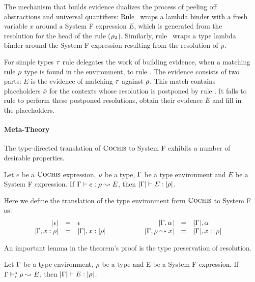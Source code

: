 The mechanism that builds evidence dualizes the process of peeling off
abstractions and universal quantifiers: Rule ~wraps a lambda
binder with a fresh variable $x$ around a System F expression $E$, which is
generated from the resolution for the head of the rule ($\rho_2$). Similarly,
rule ~wraps a type lambda binder around the System F expression
resulting from the resolution of $\rho$.

For simple types $\tau$ rule  delegates the work of
building evidence, when a matching rule $\rho$ type is found in the
environment, to rule . The evidence consists of two parts:
$E$ is the evidence of matching $\tau$ against $\rho$. This match contains
placeholders $\bar{x}$ for the contexts whose resolution is postponed by rule
. It falls to rule  to perform these
postponed resolutions, obtain their evidence $\bar{E}$ and fill in the
placeholders.

\paragraph{Meta-Theory} The type-directed translation of $\textsc{Cochis}$ to System F exhibits a number
of desirable properties.

\begin{theorem}\label{thm:type:preservation} Let $e$ be a $\textsc{Cochis}$
  expression, $\rho$ be a type, $\Gamma$ be a type environment and $E$ be a System F expression. If
  $\Gamma \vdash e:\rho \leadsto E$, then $|\Gamma| \vdash E:|\rho|$.
\end{theorem}
Here we define the translation of the type environment form $\textsc{Cochis}$ to System F as:
\begin{equation*}
\begin{array}{rcl@{\hspace{2cm}}rcl}
|\epsilon| & = & \epsilon & |\tenv,\alpha| & = & |\tenv|, \alpha \\
|\tenv,x : \rulet| & = & |\tenv|, x : |\rulet| &
|\tenv, \rulet \leadsto x| & = & |\tenv|, x : |\rulet|
\end{array}
\end{equation*}

An important lemma in the theorem's proof is the type preservation of 
resolution.
\begin{lemma}
Let $\Gamma$ be a type environment, $\rho$ be a type and E be a System F expression.
If $\Gamma \vdash^\mathrm{a}_{\mathrm{r}} \rho \leadsto E$, then $|\Gamma| \vdash E : |\rho|$.
\end{lemma}

